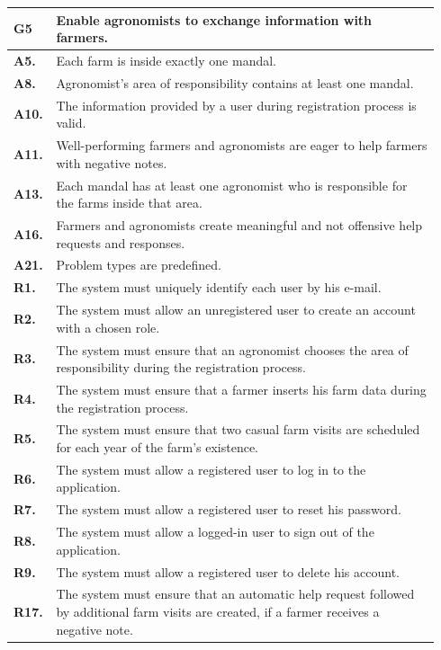 \begin{longtable}{p{0.06\linewidth} p{0.88\linewidth}} 
    \toprule
    \textbf{G5} & Enable agronomists to exchange information with farmers. \\ 
    \midrule
    \textbf{A5.} & Each farm is inside exactly one mandal.\\ 
    \textbf{A8.} & Agronomist's area of responsibility contains at least one mandal.\\ 
    \textbf{A10.} & The information provided by a user during registration process is valid.\\ 
    \textbf{A11.} & Well-performing farmers and agronomists are eager to help farmers with negative notes.\\ 
    \textbf{A13.} & Each mandal has at least one agronomist who is responsible for the farms inside that area.\\ 
    \textbf{A16.} & Farmers and agronomists create meaningful and not offensive help requests and responses. \\
    \textbf{A21.} & Problem types are predefined.\\
    \midrule
    
	\textbf{R1.} & The system must uniquely identify each user by his e-mail. \\
	\textbf{R2.} & The system must allow an unregistered user to create an account with a chosen role. \\
	\textbf{R3.} & The system must ensure that an agronomist chooses the area of responsibility during the registration process. \\
	\textbf{R4.} & The system must ensure that a farmer inserts his farm data during the registration process.\\
	\textbf{R5.} & The system must ensure that two casual farm visits are scheduled for each year of the farm's existence.\\
	\textbf{R6.} & The system must allow a registered user to log in to the application. \\
	\textbf{R7.} & The system must allow a registered user to reset his password. \\
	\textbf{R8.} & The system must allow a logged-in user to sign out of the application. \\
	\textbf{R9.} & The system must allow a registered user to delete his account. \\
	
    \textbf{R17.} & The system must ensure that an automatic help request followed by additional farm visits are created, if a farmer receives a negative note.\\
	

\end{longtable}
